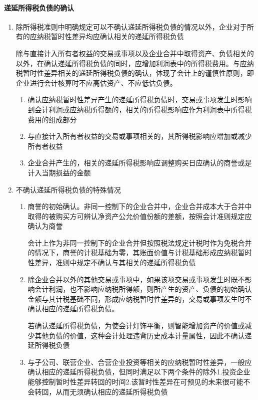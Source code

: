 \documentclass[UTF8,12pt]{ctexart}
\numberwithin{equation}{section} %
\numberwithin{figure}{section}
\numberwithin{table}{section}
\begin{document}
	\paragraph{递延所得税负债的确认}
	\begin{enumerate}
		\item 除所得税准则中明确规定可以不确认递延所得税负债的情况以外，企业对于所有的应纳税暂时性差异均应确认相关的递延所得税负债
		
		除与直接计入所有者权益的交易或事项以及企业合并中取得资产、负债相关的以外，在确认递延所得税负债的同时，应增加利润表中的所得税费用。与应纳税暂时性差异相关的递延所得税负债的确认，体现了会计上的谨慎性原则，即企业进行会计核算时不应高估资产、不应低估负债。
		
		\begin{enumerate}
			\item 确认应纳税暂时性差异产生的递延所得税负债时，交易或事项发生时影响到会计利润或应纳税所得额的，相关的所得税影响应作为利润表中所得税费用的组成部分
			
			\item 与直接计入所有者权益的交易或事项相关的，其所得税影响应增加或减少所有者权益
			
			\item 企业合并产生的，相关的递延所得税影响应调整购买日应确认的商誉或是计入当期损益的金额
		\end{enumerate}
		
		\item 不确认递延所得税负债的特殊情况
		\begin{enumerate}
			\item 商誉的初始确认。非同一控制下的企业合并中，企业合并成本大于合并中取得的被购买方可辨认净资产公允价值份额的差额，按照会计准则规定应确认为商誉
			
			会计上作为非同一控制下的企业合并但按照税法规定计税时作为免税合并的情况下，商誉的计税基础为零，其账面价值与计税基础形成应纳税暂时性差异，准则中规定不确认与其相关的递延所得税负债
			
			\item 除企业合并以外的其他交易或事项中，如果该项交易或事项发生时既不影响会计利润，也不影响应纳税所得额，则所产生的资产、负债的初始确认金额与其计税基础不同，形成应纳税暂时性差异的，交易或事项发生时不确认相应的递延所得税负债。
			
			若确认递延所得税负债，为使会计灯饰平衡，则智能增加资产的价值或减少其他负债的价值，这种会计处理违背历史成本计量属性，因此不确认递延所得税负债
			
			\item 与子公司、联营企业、合营企业投资等相关的应纳税暂时性差异，一般应确认相应的递延所得税负债，但同时满足以下两个条件的除外1.投资企业能够控制暂时性差异转回的时间2.该暂时性差异在可预见的未来很可能不会转回，从而无须确认相应的递延所得税负债
			

\end{enumerate}
\end{enumerate}
\end{document}
